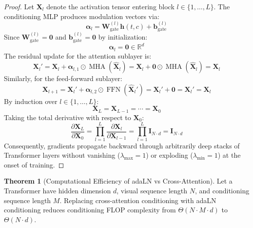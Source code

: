 \documentclass[11pt,a4paper]{article}
\theoremstyle{definition}
\newtheorem{theorem}{\textbf{Theorem}}[section]
\begin{document}
\begin{proof}
Let $\mathbf{X}_l$ denote the activation tensor entering block $l \in \{1, \dots, L\}$.
The conditioning MLP produces modulation vectors via:
{\boldmath
\begin{equation}
\boldsymbol{\alpha}_l = \mathbf{W}_{\text{gate}}^{(l)} \mathbf{h}(t, c) + \mathbf{b}_{\text{gate}}^{(l)}
\end{equation}
}
Since $\mathbf{W}_{\text{gate}}^{(l)} = \mathbf{0}$ and $\mathbf{b}_{\text{gate}}^{(l)} = \mathbf{0}$ by initialization:
{\boldmath
\begin{equation}
\boldsymbol{\alpha}_l = \mathbf{0} \in \mathbb{R}^d
\end{equation}
}
The residual update for the attention sublayer is:
{\boldmath
\begin{equation}
\mathbf{X}_l' = \mathbf{X}_l + \boldsymbol{\alpha}_{l, 1} \odot \operatorname{MHA}(\hat{\mathbf{X}}_l) = \mathbf{X}_l + \mathbf{0} \odot \operatorname{MHA}(\hat{\mathbf{X}}_l) = \mathbf{X}_l
\end{equation}
}
Similarly, for the feed-forward sublayer:
{\boldmath
\begin{equation}
\mathbf{X}_{l+1} = \mathbf{X}_l' + \boldsymbol{\alpha}_{l, 2} \odot \operatorname{FFN}(\hat{\mathbf{X}}_l') = \mathbf{X}_l' + \mathbf{0} = \mathbf{X}_l' = \mathbf{X}_l
\end{equation}
}
By induction over $l \in \{1, \dots, L\}$:
{\boldmath
\begin{equation}
\mathbf{X}_L = \mathbf{X}_{L-1} = \cdots = \mathbf{X}_0
\end{equation}
}
Taking the total derivative with respect to $\mathbf{X}_0$:
{\boldmath
\begin{equation}
\frac{\partial \mathbf{X}_L}{\partial \mathbf{X}_0} = \prod_{l=1}^L \frac{\partial \mathbf{X}_l}{\partial \mathbf{X}_{l-1}} = \prod_{l=1}^L \mathbf{I}_{N \cdot d} = \mathbf{I}_{N \cdot d}
\end{equation}
}
Consequently, gradients propagate backward through arbitrarily deep stacks of Transformer layers without vanishing ($\lambda_{\max} = 1$) or exploding ($\lambda_{\min} = 1$) at the onset of training.
\end{proof}

\begin{theorem}[Computational Efficiency of adaLN vs Cross-Attention]
Let a Transformer have hidden dimension $d$, visual sequence length $N$, and conditioning sequence length $M$. Replacing cross-attention conditioning with adaLN conditioning reduces conditioning FLOP complexity from $\Theta(N \cdot M \cdot d)$ to $\Theta(N \cdot d)$.
\end{theorem}
\end{document}
